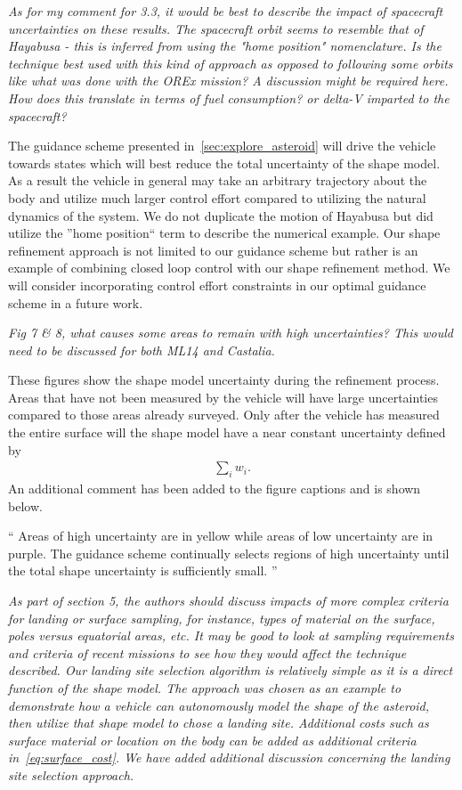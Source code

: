 \documentclass[11pt]{article}
\newenvironment{correction}{\begin{list}{}{\setlength{\leftmargin}{1cm}\setlength{\rightmargin}{1cm}}\vspace{\parsep}\item[]``}{''\end{list}}
\newcommand{\comment}[1]{\item \itshape #1 \normalfont}
\begin{document}
\begin{itemize}
\comment{
As for my comment for 3.3, it would be best to describe the impact of spacecraft uncertainties on these results.
The spacecraft orbit seems to resemble that of Hayabusa - this is inferred from using the "home position" nomenclature. 
Is the technique best used with this kind of approach as opposed to following some orbits like what was done with the OREx mission? A discussion might be required here.
How does this translate in terms of fuel consumption? or delta-V imparted to the spacecraft?  
}

The guidance scheme presented in~\cref{sec:explore_asteroid} will drive the vehicle towards states which will best reduce the total uncertainty of the shape model.
As a result the vehicle in general may take an arbitrary trajectory about the body and utilize much larger control effort compared to utilizing the natural dynamics of the system. 
We do not duplicate the motion of Hayabusa but did utilize the ''home position`` term to describe the numerical example.
Our shape refinement approach is not limited to our guidance scheme but rather is an example of combining closed loop control with our shape refinement method.
We will consider incorporating control effort constraints in our optimal guidance scheme in a future work.

\comment{
Fig 7 \& 8, what causes some areas to remain with high uncertainties? This would need to be discussed for both ML14 and Castalia.
}

These figures show the shape model uncertainty during the refinement process.
Areas that have not been measured by the vehicle will have large uncertainties compared to those areas already surveyed. 
Only after the vehicle has measured the entire surface will the shape model have a near constant uncertainty defined by 
\begin{align*}
    \sum_i w_i.
\end{align*}
An additional comment has been added to the figure captions and is shown below.

\begin{correction}
    Areas of high uncertainty are in yellow while areas of low uncertainty are in purple.
    The guidance scheme continually selects regions of high uncertainty until the total shape uncertainty is sufficiently small.
\end{correction}

\comment{
As part of section 5, the authors should discuss impacts of more complex criteria for landing or surface sampling, for instance, types of material on the surface, poles versus equatorial areas, etc. 
It may be good to look at sampling requirements and criteria of recent missions to see how they would affect the technique described.
}
Our landing site selection algorithm is relatively simple as it is a direct function of the shape model.
The approach was chosen as an example to demonstrate how a vehicle can autonomously model the shape of the asteroid, then utilize that shape model to chose a landing site. 
Additional costs such as surface material or location on the body can be added as additional criteria in~\cref{eq:surface_cost}.
We have added additional discussion concerning the landing site selection approach.


\end{itemize}
\end{document}

